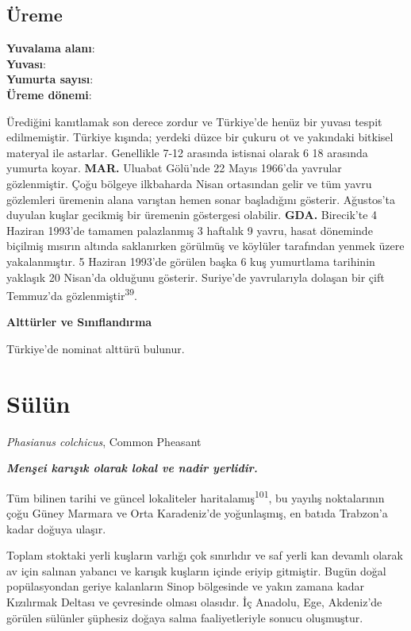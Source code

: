\documentclass[
  letterpaper,
  DIV=11,
  numbers=noendperiod]{scrreprt}
\begin{document}
\hypertarget{uxfcreme-42}{%
\subsection{\texorpdfstring{\textbf{Üreme}}{Üreme}}\label{uxfcreme-42}}

\textbf{Yuvalama alanı}:\\
\textbf{Yuvası}:\\
\textbf{Yumurta sayısı}:\\
\textbf{Üreme dönemi}:

Ürediğini kanıtlamak son derece zordur ve Türkiye'de henüz bir yuvası
tespit edilmemiştir. Türkiye kışında; yerdeki düzce bir çukuru ot ve
yakındaki bitkisel materyal ile astarlar. Genellikle 7-12 arasında
istisnai olarak 6 18 arasında yumurta koyar. \textbf{MAR.} Uluabat
Gölü'nde 22 Mayıs 1966'da yavrular gözlenmiştir. Çoğu bölgeye ilkbaharda
Nisan ortasından gelir ve tüm yavru gözlemleri üremenin alana varıştan
hemen sonar başladığını gösterir. Ağustos'ta duyulan kuşlar gecikmiş bir
üremenin göstergesi olabilir. \textbf{GDA.} Birecik'te 4 Haziran 1993'de
tamamen palazlanmış 3 haftalık 9 yavru, hasat döneminde biçilmiş mısırın
altında saklanırken görülmüş ve köylüler tarafından yenmek üzere
yakalanmıştır. 5 Haziran 1993'de görülen başka 6 kuş yumurtlama
tarihinin yaklaşık 20 Nisan'da olduğunu gösterir. Suriye'de yavrularıyla
dolaşan bir çift Temmuz'da gözlenmiştir\textsuperscript{39}.

\textbf{Alttürler ve Sınıflandırma}

Türkiye'de nominat alttürü bulunur.

\hypertarget{suxfcluxfcn}{%
\section{Sülün}\label{suxfcluxfcn}}

\emph{Phasianus colchicus}, Common Pheasant

\textbf{\emph{Menşei karışık olarak lokal ve nadir yerlidir.}}

Tüm bilinen tarihi ve güncel lokaliteler
haritalamış\textsuperscript{101}, bu yayılış noktalarının çoğu Güney
Marmara ve Orta Karadeniz'de yoğunlaşmış, en batıda Trabzon'a kadar
doğuya ulaşır.

Toplam stoktaki yerli kuşların varlığı çok sınırlıdır ve saf yerli kan
devamlı olarak av için salınan yabancı ve karışık kuşların içinde eriyip
gitmiştir. Bugün doğal popülasyondan geriye kalanların Sinop bölgesinde
ve yakın zamana kadar Kızılırmak Deltası ve çevresinde olması olasıdır.
İç Anadolu, Ege, Akdeniz'de görülen sülünler şüphesiz doğaya salma
faaliyetleriyle sonucu oluşmuştur.
\end{document}
